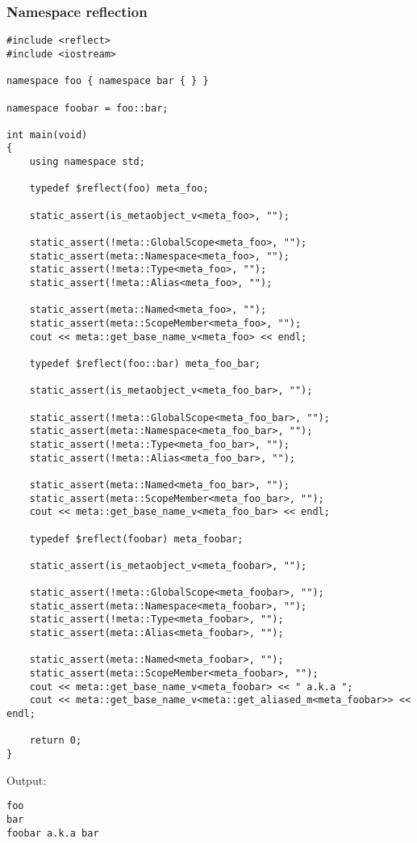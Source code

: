 \subsubsection{Namespace reflection}

\begin{verbatim}
#include <reflect>
#include <iostream>

namespace foo { namespace bar { } }

namespace foobar = foo::bar;

int main(void)
{
	using namespace std;

	typedef $reflect(foo) meta_foo;

	static_assert(is_metaobject_v<meta_foo>, "");

	static_assert(!meta::GlobalScope<meta_foo>, "");
	static_assert(meta::Namespace<meta_foo>, "");
	static_assert(!meta::Type<meta_foo>, "");
	static_assert(!meta::Alias<meta_foo>, "");

	static_assert(meta::Named<meta_foo>, "");
	static_assert(meta::ScopeMember<meta_foo>, "");
	cout << meta::get_base_name_v<meta_foo> << endl;

	typedef $reflect(foo::bar) meta_foo_bar;

	static_assert(is_metaobject_v<meta_foo_bar>, "");

	static_assert(!meta::GlobalScope<meta_foo_bar>, "");
	static_assert(meta::Namespace<meta_foo_bar>, "");
	static_assert(!meta::Type<meta_foo_bar>, "");
	static_assert(!meta::Alias<meta_foo_bar>, "");

	static_assert(meta::Named<meta_foo_bar>, "");
	static_assert(meta::ScopeMember<meta_foo_bar>, "");
	cout << meta::get_base_name_v<meta_foo_bar> << endl;

	typedef $reflect(foobar) meta_foobar;

	static_assert(is_metaobject_v<meta_foobar>, "");

	static_assert(!meta::GlobalScope<meta_foobar>, "");
	static_assert(meta::Namespace<meta_foobar>, "");
	static_assert(!meta::Type<meta_foobar>, "");
	static_assert(meta::Alias<meta_foobar>, "");

	static_assert(meta::Named<meta_foobar>, "");
	static_assert(meta::ScopeMember<meta_foobar>, "");
	cout << meta::get_base_name_v<meta_foobar> << " a.k.a ";
	cout << meta::get_base_name_v<meta::get_aliased_m<meta_foobar>> << endl;

	return 0;
}
\end{verbatim}

Output:

\begin{verbatim}
foo
bar
foobar a.k.a bar
\end{verbatim}

